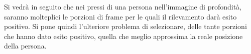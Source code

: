                Si vedrà in seguito che nei pressi di una persona nell'immagine di profondità, saranno molteplici le porzioni di frame per le quali il rilevamento darà esito positivo.
                Si pone quindi l'ulteriore problema di selezionare, delle tante porzioni che hanno dato esito positivo, quella che meglio approssima la reale posizione della persona. 
